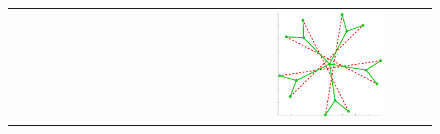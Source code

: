 \documentclass[11pt,a4paper]{book}
\newcommand{\wToy}{0.288}
\begin{document}
\begin{figure}[h!]
\begin{tabular}{rccc}
    \includegraphics[width=\wToy\textwidth]{img-sgd/toy.5.l} \\


\end{tabular}
\end{figure}
\end{document}
